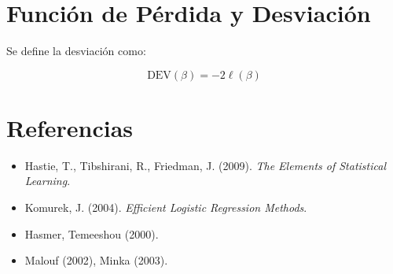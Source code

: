 \documentclass[12pt]{article}
\begin{document}
\section{Función de Pérdida y Desviación}
Se define la desviación como:

\[
\text{DEV}(\beta) = -2 \ell(\beta)
\]

\section{Referencias}
\begin{itemize}
    \item Hastie, T., Tibshirani, R., Friedman, J. (2009). \textit{The Elements of Statistical Learning}.
    \item Komurek, J. (2004). \textit{Efficient Logistic Regression Methods}.
    \item Hasmer, Temeeshou (2000).
    \item Malouf (2002), Minka (2003).
\end{itemize}
\end{document}
